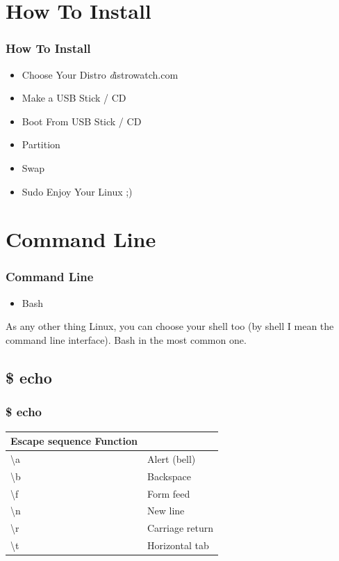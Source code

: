 \documentclass{beamer}
\begin{document}

\section{How To Install}
\begin{frame}
\frametitle{How To Install}
\begin{itemize}
\item Choose Your Distro \emph distrowatch.com
\item Make a USB Stick / CD
\item Boot From USB Stick / CD
\item Partition
\item Swap
\item Sudo Enjoy Your Linux ;)
\end{itemize}


\end{frame}

\section{Command Line}
\begin{frame}
\frametitle{Command Line}
\begin{itemize}
\item Bash
\end{itemize}
As any other thing Linux, you can choose your shell too (by shell I mean the command line interface). Bash in the most common one.


\end{frame}

\subsection{\$ echo}
\begin{frame}
\frametitle{\$ echo}
 \par
\vspace{0.15cm}
 \par
\vspace{0.15cm}
\begin{table}
\begin{tabular}{l l}
\toprule
\textbf{Escape sequence Function} & \textbf{}\\
\midrule
\textbackslash a & Alert (bell) \\
\textbackslash b & Backspace \\
\textbackslash f & Form feed \\
\textbackslash n & New line \\
\textbackslash r & Carriage return \\
\textbackslash t & Horizontal tab \\
\bottomrule
\end{tabular}
\end{table}
\end{frame}
\end{document}
